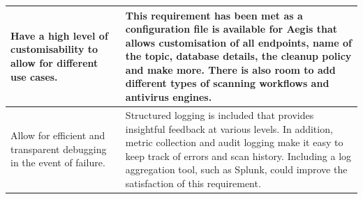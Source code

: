 \documentclass[12pt, conference, final, a4paper, onecolumn, compsoc]{IEEEtran}
\begin{document}
\begin{table}[H]
\begin{tabular}{|p{}|p{}|}
    Have a high level of customisability to allow for different use cases. &
                                                                             This
                                                                             requirement
    has been met as a configuration file is available for Aegis that allows
                                                                             customisation
                                                                             of
                                                                             all
    endpoints, name of the topic, database details, the cleanup policy and make
                                                                             more.
                                                                             There
                                                                             is
                                                                             also
                                                                             room
                                                                             to
                                                                             add
                                                                             different
                                                                             types
                                                                             of
                                                                             scanning
                                                                             workflows
                                                                             and
                                                                             antivirus engines.
  \\ \hline
    Allow for efficient and transparent debugging in the event of failure. & Structured
    logging is included that provides insightful feedback at various levels. In
                                                                             addition,
    metric collection and audit logging make it easy to keep track of errors and
    scan history. Including a log aggregation tool, such as Splunk, could
                                                                             improve
                                                                             the
    satisfaction of this requirement. \\ \hline


\end{tabular}
\end{table}
\end{document}
